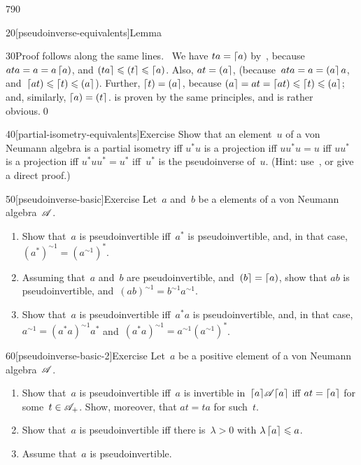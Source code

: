 \begin{parsec}{790}
\begin{point}{20}[pseudoinverse-equivalents]{Lemma}
\begin{point}{30}{Proof}
follows along the same lines.
\grayed{(\ref{pseudoinverse-2}$
	\Longrightarrow$%
\ref{pseudoinverse-5})}\ 
We have $ta=\left\lceil a\right)$ by~,
because $ata=a=a\left\lceil a\right)$,
	and $\left(ta\right\rceil\leqslant\left(t\right\rceil\leqslant\left\lceil a\right)$.
Also, $at=\left(a\right\rceil$,
(because~$ata=a=\left(a\right\rceil a$,
and~$\left\lceil at\right)\leqslant\left\lceil t\right)\leqslant \left(a\right\rceil$).
Further, $\left\lceil t\right)=\left(a\right\rceil$,
because 
	$\left(a\right\rceil=at=\left\lceil at\right)\leqslant \left\lceil t\right)\leqslant\left(a\right\rceil$;
and, similarly, $\left\lceil a\right)=\left(t\right\rceil$.
\grayed{(\ref{pseudoinverse-4}$
	\Longrightarrow$%
\ref{pseudoinverse-5})}
is proven by the same principles, and
\grayed{(\ref{pseudoinverse-5}$
	\Longrightarrow$%
\ref{pseudoinverse-1},\ref{pseudoinverse-3})}
is rather obvious.\qed
\end{point}
\end{point}
\begin{point}{40}[partial-isometry-equivalents]{Exercise}%
Show that an element~$u$ of a von Neumann algebra
is a partial isometry iff
$u^*u$ is a projection
iff $uu^*u=u$
iff $uu^*$ is a projection
iff $u^*uu^*=u^*$
iff~$u^*$ is the pseudoinverse of~$u$.
(Hint: use~,
or give a direct proof.)
\end{point}
\begin{point}{50}[pseudoinverse-basic]{Exercise}%
Let~$a$ and~$b$ be a elements of a von Neumann algebra~$\mathscr{A}$.
\begin{enumerate}
\item
Show that~$a$ is pseudoinvertible
iff~$a^*$ is pseudoinvertible,
and, in that case, $(a^*)^{\sim1}=(a^{\sim1})^*$.
\item
Assuming that~$a$ and~$b$ are pseudoinvertible,
and~$\left(b\right\rceil=\left\lceil a\right)$,
show that $ab$ is pseudoinvertible,
and~$(ab)^{\sim1}=b^{\sim1}a^{\sim1}$.
\item
Show that~$a$ is pseudoinvertible
iff~$a^*a$ is pseudoinvertible,
and, in that case, $a^{\sim 1} = (a^*a)^{\sim1}a^*$
and~$(a^*a)^{\sim1}=a^{\sim1}(a^{\sim1})^*$.
\end{enumerate}
\spacingfix
\end{point}%
\begin{point}{60}[pseudoinverse-basic-2]{Exercise}%
Let~$a$ be a positive element of a von Neumann algebra~$\mathscr{A}$.
\begin{enumerate}
\item
Show that~$a$ is pseudoinvertible iff~$a$
is invertible in~$\left\lceil a\right\rceil\!\mathscr{A}\!\left\lceil a\right\rceil$
iff $at=\left\lceil a\right\rceil$ for some~$t\in\mathscr{A}_+$.
Show, moreover, that $at=ta$ for such~$t$.
\item
Show that~$a$ is pseudoinvertible iff
there is~$\lambda>0$ with $\lambda \left\lceil a\right\rceil\leqslant a$.
\item
Assume that~$a$ is pseudoinvertible.


\end{enumerate}
\end{point}
\end{parsec}
